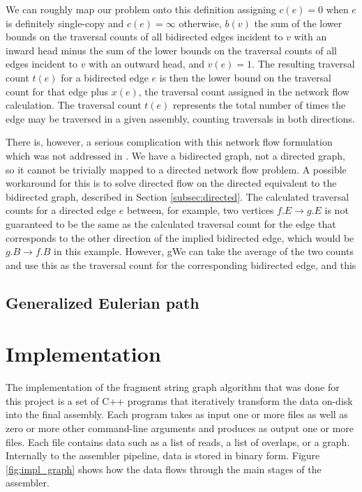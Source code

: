 \documentclass[12pt]{article}
\newcommand{\Figure}[1]{Figure \ref{#1}}
\newcommand{\Subsection}[1]{Section \ref{#1}}
\begin{document}
We can roughly map our problem onto this definition assigning $c(e) = 0$ when
$e$ is definitely single-copy and $c(e) = \infty$ otherwise, $b(v)$ the sum
of the lower bounds on the traversal counts of all bidirected edges incident to
$v$ with an inward head minus the sum of the lower bounds on the traversal
counts of all edges incident to $v$ with an outward head, and $v(e) = 1$.  The
resulting traversal count $t(e)$ for a bidirected edge $e$ is then the lower
bound on the traversal count for that edge plus $x(e)$, the traversal count
assigned in the network flow calculation.  The traversal count $t(e)$ represents
the total number of times the edge may be traversed in a given assembly,
counting traversals in both directions.

There is, however, a serious complication with this network flow formulation
which was not addressed in \cite{Myers2005}.  We have a bidirected graph, not a
directed graph, so it cannot be trivially mapped to a directed network flow
problem.  A possible workaround for this is to solve directed flow on the
directed equivalent to the bidirected graph, described in
\Subsection{subsec:directed}.  The calculated traversal counts for a directed
edge $e$ between, for example, two vertices $f.E \to g.E$ is not guaranteed to
be the same as the calculated traversal count for the edge that corresponds to
the other direction of the implied bidirected edge, which would be $g.B \to f.B$
in this example.  However, gWe can take the average of the two counts and use this as the
traversal count for the corresponding bidirected edge, and this 


\subsection{Generalized Eulerian path}

\section{Implementation}

The implementation of the fragment string graph algorithm that was done for this
project is a set of C++ programs that iteratively transform the data on-disk
into the final assembly.  Each program takes as input one or more files as well
as zero or more other command-line arguments and produces as output one or more
files.  Each file contains data such as a list of reads, a list of overlaps, or
a graph.  Internally to the assembler pipeline, data is stored in binary form.
\Figure{fig:impl_graph} shows how the data flows through the main stages of the
assembler.
\end{document}
